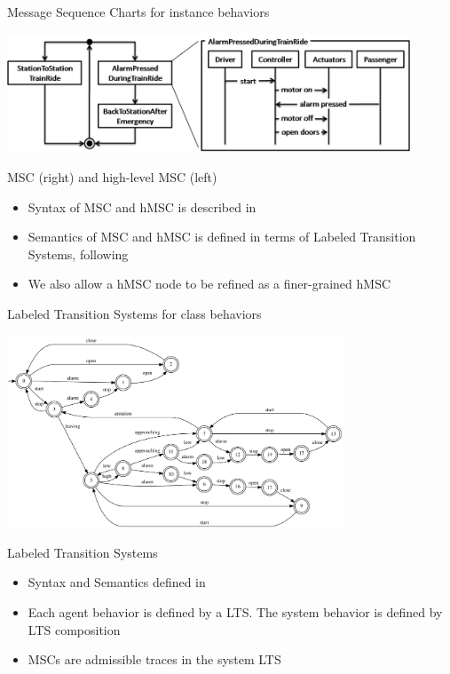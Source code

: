\begin{frame}{Message Sequence Charts for instance behaviors}
  \begin{center}
	  \includegraphics[width=12cm]{images/Train_hMSC_MSC.png}
  \end{center}
  \begin{block}{MSC (right) and high-level MSC (left)}
	  \begin{itemize}
		  \item Syntax of MSC and hMSC is described in \cite{ITU96}
		  \item Semantics of MSC and hMSC is defined in terms of Labeled Transition Systems, following \cite{Uchitel03}
		  \item We also allow a hMSC node to be refined as a finer-grained hMSC
	  \end{itemize}
  \end{block}
\end{frame}

\begin{frame}{Labeled Transition Systems for class behaviors}
  \vspace{-0.5cm}
  \begin{center}
	  \includegraphics[width=10cm]{images/bigtrain.pdf}
  \end{center}
  \vspace{-1.5cm}
  \begin{block}{Labeled Transition Systems}
	  \begin{itemize}
		  \item Syntax and Semantics defined in \cite{Magee99}
		  \item Each agent behavior is defined by a LTS. The system behavior is defined by LTS composition
		  \item MSCs are admissible traces in the system LTS \cite{Uchitel03}
	  \end{itemize}
  \end{block}
\end{frame}

